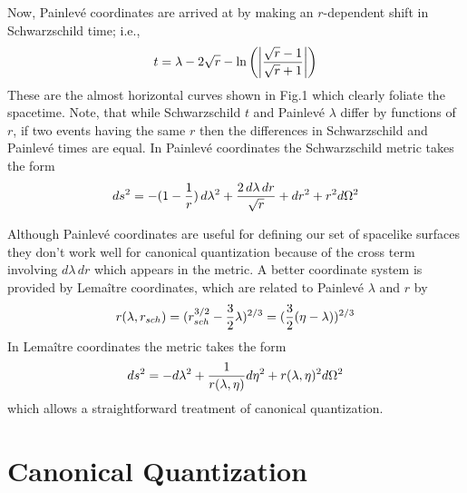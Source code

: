 \documentclass[12pt]{article}
\begin{document}
Now, Painlev\'e coordinates are arrived at by making an $r$-dependent shift in
Schwarzschild time; i.e.,
\begin{equation}
 t = \lambda - 2\sqrt{r} - \ln\left(\left\vert{\sqrt{r} - 1 \over \sqrt{r} + 1}\right\vert\right)
\end{equation}
These are the almost horizontal curves shown in Fig.1 which clearly foliate
the spacetime. Note, that while Schwarzschild $t$ and Painlev\'e $\lambda$
differ by functions of $r$, if two events having the same $r$ then the differences in
Schwarzschild and Painlev\'e times are equal.
In Painlev\'e coordinates the Schwarzschild metric takes the form
\begin{equation}
ds^2 = -(1 - {1 \over r}) \,d\lambda^2 + {2\,d\lambda\,dr \over \sqrt{r}} + dr^2 +  r^2 d\Omega^2
\end{equation}
\epsfverbosetrue
\begin{figure}
\begin{center}
\leavevmode
\vskip 2in
\end{center}
\vskip -2in
\caption[kruskaletc]{}
\label{kruskal}
\end{figure}
Although Painlev\'e coordinates are useful for defining our set of spacelike surfaces
they don't work well for canonical quantization because of the cross term
involving $d\lambda\,dr$ which appears in the metric.  A better coordinate system
is provided by Lema\^itre coordinates, which are related to Painlev\'e $\lambda$ and $r$ by
\begin{equation}
	r(\lambda,r_{sch}) = (r_{sch}^{3/2} - {3\over 2}\lambda)^{2/3}
	= ({3\over 2} (\eta - \lambda))^{2/3}
\end{equation}
In Lema\^itre coordinates the metric takes the form
\begin{equation}
ds^2 = - d\lambda^2 + {1\over r(\lambda,\eta)} d\eta^2 + r(\lambda,\eta)^2 d\Omega^2
\end{equation}
which allows a straightforward treatment of canonical quantization.

\section{Canonical Quantization}
\end{document}

